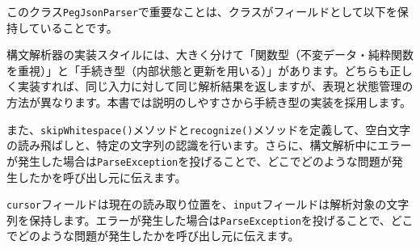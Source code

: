 \begin{Shaded}
\begin{Highlighting}[]
    \CommentTok{/**}\CommentTok{:}\CommentTok{=}\CommentTok{|}\CommentTok{\{}\CommentTok{\}}\CommentTok{*/}
     \NormalTok{() \{}
\NormalTok{    \}}

    \CommentTok{/**}\CommentTok{:}\CommentTok{=}\CommentTok{|}\CommentTok{\{}\CommentTok{\}}\CommentTok{*/}
     \NormalTok{() \{}
\NormalTok{    \}}
\NormalTok{\}}
\end{Highlighting}
\end{Shaded}

このクラス\texttt{PegJsonParser}で重要なことは、クラスがフィールドとして以下を保持していることです。

\begin{Shaded}
\begin{Highlighting}[]
 
     
     
\NormalTok{\}}
\end{Highlighting}
\end{Shaded}

構文解析器の実装スタイルには、大きく分けて「関数型（不変データ・純粋関数を重視）」と「手続き型（内部状態と更新を用いる）」があります。どちらも正しく実装すれば、同じ入力に対して同じ解析結果を返しますが、表現と状態管理の方法が異なります。本書では説明のしやすさから手続き型の実装を採用します。

また、\texttt{skipWhitespace()}メソッドと\texttt{recognize()}メソッドを定義して、空白文字の読み飛ばしと、特定の文字列の認識を行います。さらに、構文解析中にエラーが発生した場合は\texttt{ParseException}を投げることで、どこでどのような問題が発生したかを呼び出し元に伝えます。

\texttt{cursor}フィールドは現在の読み取り位置を、\texttt{input}フィールドは解析対象の文字列を保持します。エラーが発生した場合は\texttt{ParseException}を投げることで、どこでどのような問題が発生したかを呼び出し元に伝えます。

